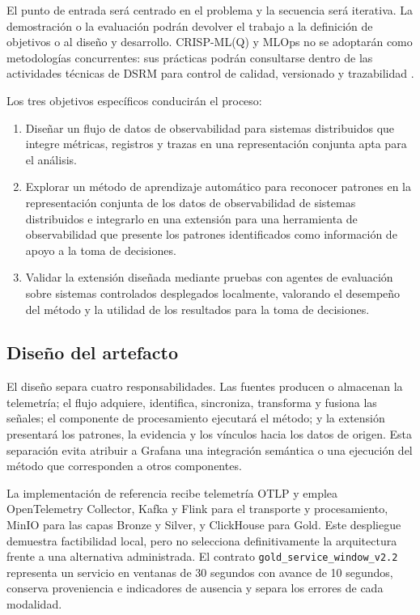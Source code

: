 \documentclass[conference]{IEEEtran}
\begin{document}
El punto de entrada será centrado en el problema y la secuencia será iterativa. La demostración o la evaluación podrán devolver el trabajo a la definición de objetivos o al diseño y desarrollo. CRISP-ML(Q) y MLOps no se adoptarán como metodologías concurrentes: sus prácticas podrán consultarse dentro de las actividades técnicas de DSRM para control de calidad, versionado y trazabilidad \cite{ref2,ref24}.

Los tres objetivos específicos conducirán el proceso:

\begin{enumerate}
    \item Diseñar un flujo de datos de observabilidad para sistemas distribuidos que integre métricas, registros y trazas en una representación conjunta apta para el análisis.
    \item Explorar un método de aprendizaje automático para reconocer patrones en la representación conjunta de los datos de observabilidad de sistemas distribuidos e integrarlo en una extensión para una herramienta de observabilidad que presente los patrones identificados como información de apoyo a la toma de decisiones.
    \item Validar la extensión diseñada mediante pruebas con agentes de evaluación sobre sistemas controlados desplegados localmente, valorando el desempeño del método y la utilidad de los resultados para la toma de decisiones.
\end{enumerate}

\subsection{Diseño del artefacto}

El diseño separa cuatro responsabilidades. Las fuentes producen o almacenan la telemetría; el flujo adquiere, identifica, sincroniza, transforma y fusiona las señales; el componente de procesamiento ejecutará el método; y la extensión presentará los patrones, la evidencia y los vínculos hacia los datos de origen. Esta separación evita atribuir a Grafana una integración semántica o una ejecución del método que corresponden a otros componentes.

La implementación de referencia recibe telemetría OTLP y emplea OpenTelemetry Collector, Kafka y Flink para el transporte y procesamiento, MinIO para las capas Bronze y Silver, y ClickHouse para Gold. Este despliegue demuestra factibilidad local, pero no selecciona definitivamente la arquitectura frente a una alternativa administrada. El contrato \texttt{gold\_service\_window\_v2.2} representa un servicio en ventanas de 30 segundos con avance de 10 segundos, conserva proveniencia e indicadores de ausencia y separa los errores de cada modalidad.
\end{document}
